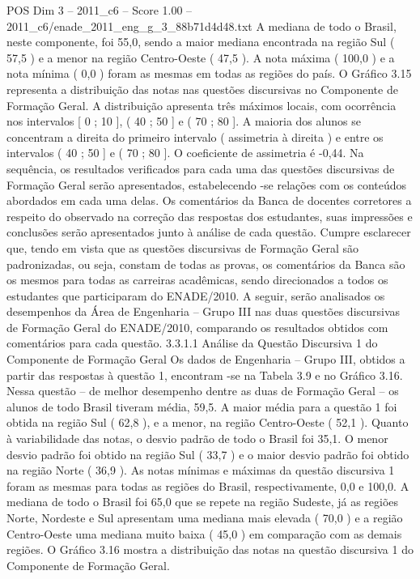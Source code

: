 \begin{textsample}{POS Dim 3 – 2011\_c6 – Score 1.00 – 2011\_c6/enade\_2011\_eng\_g\_3\_88b71d4d48.txt}
A mediana de todo o Brasil, neste componente, foi 55,0, sendo a maior mediana encontrada na região Sul ( 57,5 ) e a menor na região Centro-Oeste ( 47,5 ).
A nota máxima ( 100,0 ) e a nota mínima ( 0,0 ) foram as mesmas em todas as regiões do país.
O Gráfico 3.15 representa a distribuição das notas nas questões discursivas no Componente de Formação Geral.
A distribuição apresenta três máximos locais, com ocorrência nos intervalos [ 0 ; 10 ], ( 40 ; 50 ] e ( 70 ; 80 ].
A maioria dos alunos se concentram a direita do primeiro intervalo ( assimetria à direita ) e entre os intervalos ( 40 ; 50 ] e ( 70 ; 80 ].
O coeficiente de assimetria é -0,44.
Na sequência, os resultados verificados para cada uma das questões discursivas de Formação Geral serão apresentados, estabelecendo -se relações com os conteúdos abordados em cada uma delas.
Os comentários da Banca de docentes corretores a respeito do observado na correção das respostas dos estudantes, suas impressões e conclusões serão apresentados junto à análise de cada questão.
Cumpre esclarecer que, tendo em vista que as questões discursivas de Formação Geral são padronizadas, ou seja, constam de todas as provas, os comentários da Banca são os mesmos para todas as carreiras acadêmicas, sendo direcionados a todos os estudantes que participaram do ENADE/2010.
A seguir, serão analisados os desempenhos da Área de Engenharia – Grupo III nas duas questões discursivas de Formação Geral do ENADE/2010, comparando os resultados obtidos com comentários para cada questão. 3.3.1.1 Análise da Questão Discursiva 1 do Componente de Formação Geral Os dados de Engenharia – Grupo III, obtidos a partir das respostas à questão 1, encontram -se na Tabela 3.9 e no Gráfico 3.16.
Nessa questão – de melhor desempenho dentre as duas de Formação Geral – os alunos de todo Brasil tiveram média, 59,5.
A maior média para a questão 1 foi obtida na região Sul ( 62,8 ), e a menor, na região Centro-Oeste ( 52,1 ).
Quanto à variabilidade das notas, o desvio padrão de todo o Brasil foi 35,1.
O menor desvio padrão foi obtido na região Sul ( 33,7 ) e o maior desvio padrão foi obtido na região Norte ( 36,9 ).
As notas mínimas e máximas da questão discursiva 1 foram as mesmas para todas as regiões do Brasil, respectivamente, 0,0 e 100,0.
A mediana de todo o Brasil foi 65,0 que se repete na região Sudeste, já as regiões Norte, Nordeste e Sul apresentam uma mediana mais elevada ( 70,0 ) e a região Centro-Oeste uma mediana muito baixa ( 45,0 ) em comparação com as demais regiões.
O Gráfico 3.16 mostra a distribuição das notas na questão discursiva 1 do Componente de Formação Geral.

\end{textsample}
